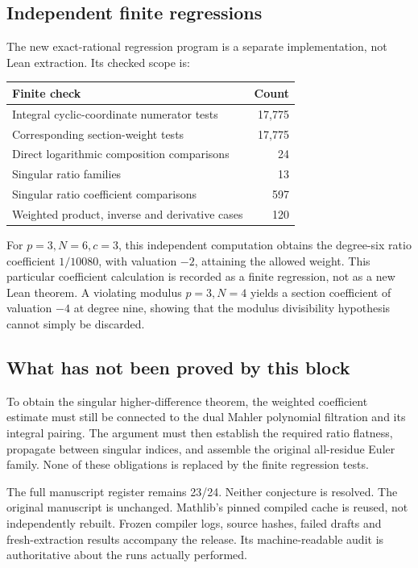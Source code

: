 \subsection*{Independent finite regressions}
The new exact-rational regression program is a separate implementation, not Lean extraction. Its checked scope is:
\begin{center}\begin{tabular}{lr}\toprule
Finite check & Count\\\midrule
Integral cyclic-coordinate numerator tests &17,775\\
Corresponding section-weight tests &17,775\\
Direct logarithmic composition comparisons &24\\
Singular ratio families &13\\
Singular ratio coefficient comparisons &597\\
Weighted product, inverse and derivative cases &120\\\bottomrule
\end{tabular}\end{center}
For $p=3,N=6,c=3$, this independent computation obtains the degree-six ratio coefficient $1/10080$, with valuation $-2$, attaining the allowed weight. This particular coefficient calculation is recorded as a finite regression, not as a new Lean theorem. A violating modulus $p=3,N=4$ yields a section coefficient of valuation $-4$ at degree nine, showing that the modulus divisibility hypothesis cannot simply be discarded.

\subsection*{What has not been proved by this block}
To obtain the singular higher-difference theorem, the weighted coefficient estimate must still be connected to the dual Mahler polynomial filtration and its integral pairing. The argument must then establish the required ratio flatness, propagate between singular indices, and assemble the original all-residue Euler family. None of these obligations is replaced by the finite regression tests.

The full manuscript register remains 23/24. Neither conjecture is resolved. The original manuscript is unchanged. Mathlib's pinned compiled cache is reused, not independently rebuilt. Frozen compiler logs, source hashes, failed drafts and fresh-extraction results accompany the release. Its machine-readable audit is authoritative about the runs actually performed.

